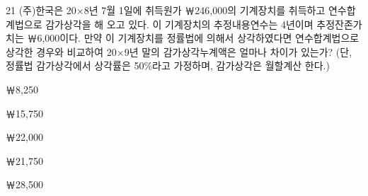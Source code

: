 \begin{question}{21}
(주)한국은 20×8년 7월 1일에 취득원가 ￦246,000의 기계장치를 취득하고 연수합계법으로 감가상각을 해 오고 있다. 이 기계장치의 추정내용연수는 4년이며 추정잔존가치는 ￦6,000이다. 만약 이 기계장치를 정률법에 의해서 상각하였다면 연수합계법으로 상각한 경우와 비교하여 20×9년 말의 감가상각누계액은 얼마나 차이가 있는가? (단, 정률법 감가상각에서 상각률은 50\%라고 가정하며, 감가상각은 월할계산 한다.)
\begin{choices}
  \item ￦8,250
  \item ￦15,750
  \item ￦22,000
  \item ￦21,750
  \item ￦28,500
\end{choices}
\end{question}
